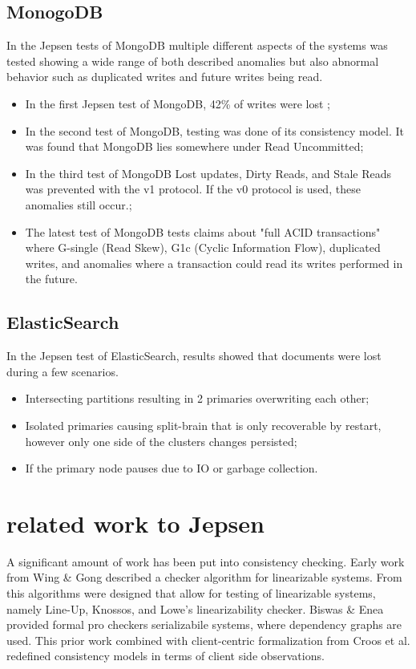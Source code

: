 \documentclass[a4paper,10pt,titlepage]{report}
\begin{document}
\subsection{MonogoDB}
In the Jepsen tests of MongoDB\cite{jepsenmongodb243, jepsenmongodb267, jepsenmongodb340} multiple different aspects of the systems was tested showing a wide range of both described anomalies but also abnormal behavior such as duplicated writes and future writes being read.
\begin{itemize}
\item In the first Jepsen test of MongoDB, 42\% of writes were lost \cite{jepsenmongodb243};
\item In the second test of MongoDB, testing was done of its consistency model. It was found that MongoDB lies somewhere under Read Uncommitted\cite{jepsenmongodb267};
\item In the third test of MongoDB Lost updates, Dirty Reads, and Stale Reads was prevented with the v1 protocol. If the v0 protocol is used, these anomalies still occur.\cite{jepsenmongodb340};
\item The latest test of MongoDB tests claims about "full ACID transactions" where G-single (Read Skew), G1c (Cyclic Information Flow), duplicated writes, and anomalies where a transaction could read its writes performed in the future. \cite{jepsenmongodb340}
\end{itemize}

\subsection{ElasticSearch}
In the Jepsen test of ElasticSearch, results showed that documents were lost during a few scenarios.\cite{aphyrelasticsearch}
\begin{itemize}
    \item Intersecting partitions resulting in 2 primaries overwriting each other;
    \item Isolated primaries causing split-brain that is only recoverable by restart, however only one side of the clusters changes persisted;
    \item If the primary node pauses due to IO or garbage collection.
\end{itemize}

\section{related work to Jepsen}

A significant amount of work has been put into consistency checking. Early work from Wing \& Gong\cite{winggong} described a checker algorithm for linearizable systems. From this algorithms were designed that allow for testing of linearizable systems, namely Line-Up\cite{Burckhardtetal}, Knossos\cite{Knossos}, and Lowe’s linearizability checker\cite{glowe}. Biswas \& Enea\cite{BiswasEnea} provided formal pro checkers serializabile systems, where dependency graphs are used. This prior work combined with client-centric formalization from Croos et al. \cite{CrooksPuAlvisiClement} redefined consistency models in terms of client side observations. 
\end{document}
